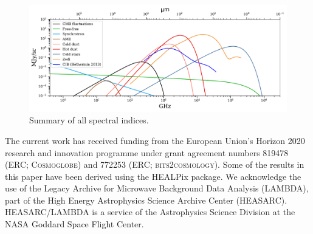 \documentclass{aa}
\begin{document}
\begin{figure}
	\centering
	\includegraphics[width=\textwidth]{figs/all_fgs.pdf}
	\caption{Summary of all spectral indices.}
	\label{fig:SED_overview}
\end{figure}

\blindtext





\begin{acknowledgements}
 The current work has received funding from the European
  Union’s Horizon 2020 research and innovation programme under grant
  agreement numbers 819478 (ERC; \textsc{Cosmoglobe}) and 772253 (ERC;
  \textsc{bits2cosmology}). Some of the results in this paper have been derived using the HEALPix \citep{HEALPIX} package.
  We acknowledge the use of the Legacy Archive for Microwave Background Data
  Analysis (LAMBDA), part of the High Energy Astrophysics Science Archive Center
  (HEASARC). HEASARC/LAMBDA is a service of the Astrophysics Science Division at
  the NASA Goddard Space Flight Center.  
\end{acknowledgements}


%



\end{document}
